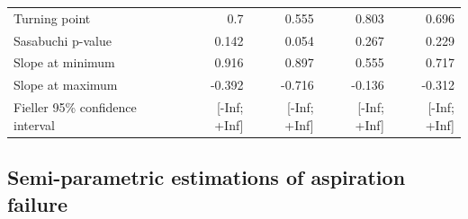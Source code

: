 \documentclass[
]{article}
\begin{document}
\begin{landscape}
\begin{longtable}[c]{@{}lrrrr@{}}
Turning point                      & 0.7              & 0.555              & 0.803             & 0.696            \\
Sasabuchi p-value                  & 0.142            & 0.054              & 0.267             & 0.229            \\
Slope at minimum                   & 0.916            & 0.897              & 0.555             & 0.717            \\
Slope at maximum                   & -0.392           & -0.716             & -0.136            & -0.312           \\
Fieller 95\% confidence   interval & {[}-Inf; +Inf{]} & {[}-Inf; +Inf{]}   & {[}-Inf; +Inf{]}  & {[}-Inf; +Inf{]} \\* \bottomrule
\end{longtable}
\end{landscape}
\newpage

\hypertarget{semi-parametric-estimations-of-aspiration-failure}{%
\subsection{Semi-parametric estimations of aspiration failure}\label{semi-parametric-estimations-of-aspiration-failure}}
\end{document}

